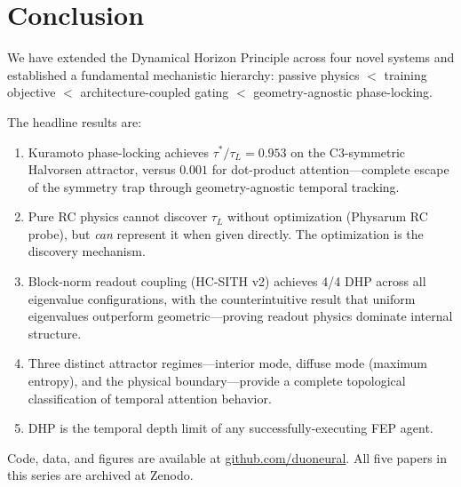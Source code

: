 \documentclass[12pt]{article}
\theoremstyle{definition}
\begin{document}
\section{Conclusion}

We have extended the Dynamical Horizon Principle across four novel systems and
established a fundamental mechanistic hierarchy: passive physics $<$ training objective
$<$ architecture-coupled gating $<$ geometry-agnostic phase-locking.

The headline results are:
\begin{enumerate}
  \item Kuramoto phase-locking achieves $\tau^*/\tau_L = 0.953$ on the C3-symmetric
    Halvorsen attractor, versus $0.001$ for dot-product attention---complete escape of
    the symmetry trap through geometry-agnostic temporal tracking.
  \item Pure RC physics cannot discover $\tau_L$ without optimization (Physarum RC
    probe), but \emph{can} represent it when given directly. The optimization is the
    discovery mechanism.
  \item Block-norm readout coupling (HC-SITH v2) achieves 4/4 DHP across all
    eigenvalue configurations, with the counterintuitive result that uniform eigenvalues
    outperform geometric---proving readout physics dominate internal structure.
  \item Three distinct attractor regimes---interior mode, diffuse mode (maximum entropy),
    and the physical boundary---provide a complete topological classification of temporal
    attention behavior.
  \item DHP is the temporal depth limit of any successfully-executing FEP agent.
\end{enumerate}

Code, data, and figures are available at \href{https://github.com/duoneural}{github.com/duoneural}.
All five papers in this series are archived at Zenodo.



\end{document}
